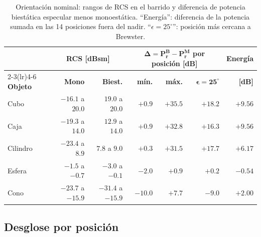 \documentclass[11pt,a4paper]{report}
\begin{document}
\begin{table}[H]
\centering
\caption{Orientación nominal: rangos de RCS en el barrido y diferencia de
potencia biestática especular menos monoestática. ``Energía'': diferencia
de la potencia sumada en las 14 posiciones fuera del nadir. ``$\epsilon=25^\circ$'':
posición más cercana a Brewster.}
\label{tab:nominal}
\begin{tabular}{@{}lrrrrrr@{}}
\toprule
& \multicolumn{2}{c}{\textbf{RCS [dBsm]}} & \multicolumn{3}{c}{$\bm{\Delta = P_r^B - P_r^M}$ \textbf{por posición [dB]}} & \textbf{Energía} \\
\cmidrule(lr){2-3}\cmidrule(lr){4-6}
\textbf{Objeto} & \textbf{Mono} & \textbf{Biest.} & \textbf{mín.} & \textbf{máx.} & $\bm{\epsilon=25^\circ}$ & \textbf{[dB]} \\
\midrule
Cubo     & $-16.1$ a $20.0$ & $19.0$ a $20.0$ & $+0.9$ & $+35.5$ & $+18.2$ & $+9.56$ \\
Caja     & $-19.3$ a $14.0$ & $12.9$ a $14.0$ & $+0.9$ & $+32.8$ & $+16.3$ & $+9.56$ \\
Cilindro & $-23.4$ a $8.9$  & $7.8$ a $9.0$   & $+0.3$ & $+31.5$ & $+17.7$ & $+6.17$ \\
Esfera   & $-1.5$ a $-0.7$  & $-3.0$ a $-0.1$ & $-2.0$ & $+0.9$  & $+0.2$  & $-0.54$ \\
Cono     & $-23.7$ a $-15.9$ & $-31.4$ a $-15.9$ & $-10.0$ & $+7.7$ & $-9.0$ & $+2.00$ \\
\bottomrule
\end{tabular}
\end{table}

\subsection{Desglose por posición}
\label{sec:res_nominal_angulo}
\end{document}
